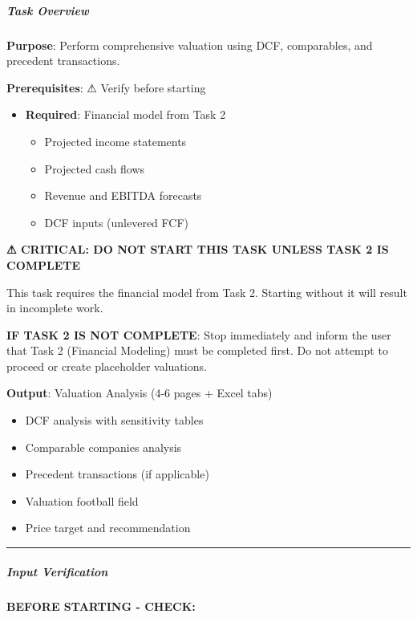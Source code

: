 \documentclass[11pt]{article}
\begin{document}
\subparagraph{Task Overview}\mbox{}\par

\textbf{Purpose}: Perform comprehensive valuation using DCF, comparables, and precedent transactions.


\textbf{Prerequisites}: ⚠ Verify before starting

\begin{itemize}[leftmargin=*,itemsep=2pt,topsep=2pt]
\item {} \textbf{Required}: Financial model from Task 2
\begin{itemize}[leftmargin=*,itemsep=2pt,topsep=2pt]
\item {} Projected income statements
\item {} Projected cash flows
\item {} Revenue and EBITDA forecasts
\item {} DCF inputs (unlevered FCF)
\end{itemize}
\end{itemize}

\textbf{⚠ CRITICAL: DO NOT START THIS TASK UNLESS TASK 2 IS COMPLETE}


This task requires the financial model from Task 2. Starting without it will result in incomplete work.


\textbf{IF TASK 2 IS NOT COMPLETE}: Stop immediately and inform the user that Task 2 (Financial Modeling) must be completed first. Do not attempt to proceed or create placeholder valuations.


\textbf{Output}: Valuation Analysis (4-6 pages + Excel tabs)

\begin{itemize}[leftmargin=*,itemsep=2pt,topsep=2pt]
\item {} DCF analysis with sensitivity tables
\item {} Comparable companies analysis
\item {} Precedent transactions (if applicable)
\item {} Valuation football field
\item {} Price target and recommendation
\end{itemize}

\vspace{0.5em}\hrule\vspace{0.5em}

\subparagraph{Input Verification}\mbox{}\par

\textbf{BEFORE STARTING - CHECK:}
\end{document}
